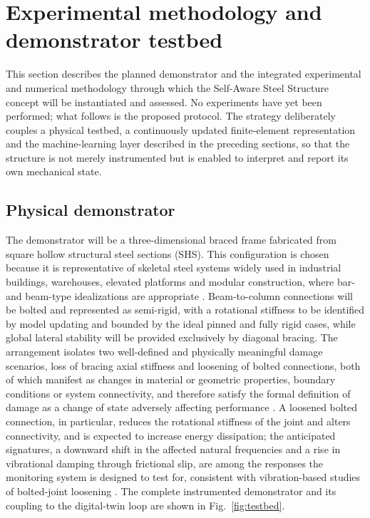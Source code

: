 \section{Experimental methodology and demonstrator testbed}\label{sec:methodology}

This section describes the planned demonstrator and the integrated experimental and numerical methodology through which the Self-Aware Steel Structure concept will be instantiated and assessed. No experiments have yet been performed; what follows is the proposed protocol. The strategy deliberately couples a physical testbed, a continuously updated finite-element representation and the machine-learning layer described in the preceding sections, so that the structure is not merely instrumented but is enabled to interpret and report its own mechanical state.

\subsection{Physical demonstrator}\label{subsec:demonstrator}

The demonstrator will be a three-dimensional braced frame fabricated from square hollow structural steel sections (SHS). This configuration is chosen because it is representative of skeletal steel systems widely used in industrial buildings, warehouses, elevated platforms and modular construction, where bar- and beam-type idealizations are appropriate \citep{cook2002fea}. Beam-to-column connections will be bolted and represented as semi-rigid, with a rotational stiffness to be identified by model updating and bounded by the ideal pinned and fully rigid cases, while global lateral stability will be provided exclusively by diagonal bracing. The arrangement isolates two well-defined and physically meaningful damage scenarios, loss of bracing axial stiffness and loosening of bolted connections, both of which manifest as changes in material or geometric properties, boundary conditions or system connectivity, and therefore satisfy the formal definition of damage as a change of state adversely affecting performance \citep{farrar2013shm}. A loosened bolted connection, in particular, reduces the rotational stiffness of the joint and alters connectivity, and is expected to increase energy dissipation; the anticipated signatures, a downward shift in the affected natural frequencies and a rise in vibrational damping through frictional slip, are among the responses the monitoring system is designed to test for, consistent with vibration-based studies of bolted-joint loosening \citep{razi2013bolted,chelimilla2023looseness}. The complete instrumented demonstrator and its coupling to the digital-twin loop are shown in Fig.~\ref{fig:testbed}.

